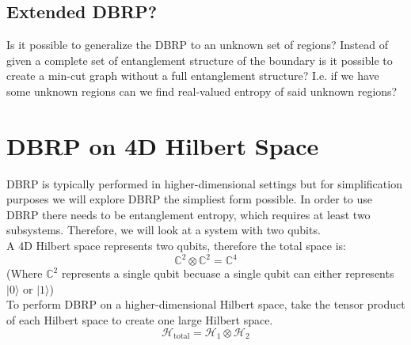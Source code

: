 \documentclass[12pt]{article}
\begin{document}
\subsection{Extended DBRP?}
\hspace{0.5cm} Is it possible to generalize the DBRP to an unknown set of regions? Instead of given a complete set of entanglement structure of the boundary is it possible to create a min-cut graph without a full entanglement structure? I.e. if we have some unknown regions can we find real-valued entropy of said unknown regions?

\section{DBRP on 4D Hilbert Space}
\hspace{0.5cm} DBRP is typically performed in higher-dimensional settings but for simplification purposes we will explore DBRP the simpliest form possible. In order to use DBRP there needs to be entanglement entropy, which requires at least two subsystems. Therefore, we will look at a system with two qubits.
\\

A 4D Hilbert space represents two qubits, therefore the total space is: 
\[
    \mathbb{C}^2 \otimes \mathbb{C}^2 = \mathbb{C}^4
\]
(Where $\mathbb{C}^2$ represents a single qubit becuase a single qubit can either represents $|0\rangle$ or $|1\rangle$)
\\
To perform DBRP on a higher-dimensional Hilbert space, take the tensor product of each Hilbert space to create one large Hilbert space.
    \[
    \mathcal{H}_{\text{total}} = \mathcal{H}_1 \otimes \mathcal{H}_2 
    \]
\end{document}
